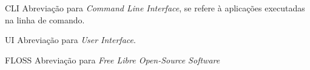 \begin{siglas}
    \item [CLI] Abreviação para \textit{Command Line Interface}, se refere à aplicações executadas na linha de comando.
    \item [UI] Abreviação para \textit{User Interface}.
    \item [FLOSS] Abreviação para \textit{Free Libre Open-Source Software}
\end{siglas}
